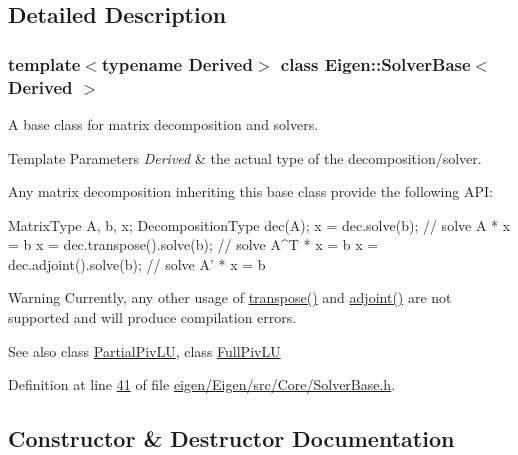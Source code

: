 \subsection{Detailed Description}
\subsubsection*{template$<$typename Derived$>$\newline
class Eigen\+::\+Solver\+Base$<$ Derived $>$}

A base class for matrix decomposition and solvers. 


\begin{DoxyTemplParams}{Template Parameters}
{\em Derived} & the actual type of the decomposition/solver.\\
\hline
\end{DoxyTemplParams}
Any matrix decomposition inheriting this base class provide the following A\+PI\+:


\begin{DoxyCode}
MatrixType A, b, x;
DecompositionType dec(A);
x = dec.solve(b);             \textcolor{comment}{// solve A   * x = b}
x = dec.transpose().solve(b); \textcolor{comment}{// solve A^T * x = b}
x = dec.adjoint().solve(b);   \textcolor{comment}{// solve A'  * x = b}
\end{DoxyCode}


\begin{DoxyWarning}{Warning}
Currently, any other usage of \hyperlink{class_eigen_1_1_solver_base_a732e75b5132bb4db3775916927b0e86c}{transpose()} and \hyperlink{class_eigen_1_1_solver_base_a05a3686a89888681c8e0c2bcab6d1ce5}{adjoint()} are not supported and will produce compilation errors.
\end{DoxyWarning}
\begin{DoxySeeAlso}{See also}
class \hyperlink{group___l_u___module_class_eigen_1_1_partial_piv_l_u}{Partial\+Piv\+LU}, class \hyperlink{group___l_u___module_class_eigen_1_1_full_piv_l_u}{Full\+Piv\+LU} 
\end{DoxySeeAlso}


Definition at line \hyperlink{eigen_2_eigen_2src_2_core_2_solver_base_8h_source_l00041}{41} of file \hyperlink{eigen_2_eigen_2src_2_core_2_solver_base_8h_source}{eigen/\+Eigen/src/\+Core/\+Solver\+Base.\+h}.



\subsection{Constructor \& Destructor Documentation}
\mbox{\label{class_eigen_1_1_solver_base_a4d5e5baddfba3790ab1a5f247dcc4dc1}} 

